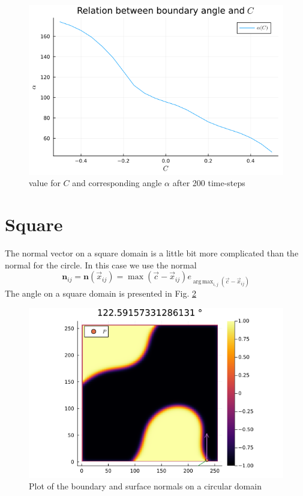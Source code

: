\documentclass{mimosis}
\DeclareMathOperator*{\argmax}{arg\,\max}
\begin{document}
\begin{figure}[htbp]
\centering
\includegraphics[width=.9\linewidth]{images/angle-values-circle.png}
\caption{\label{fig:angle-table}value for \(C\) and corresponding angle \(\alpha\) after 200 time-steps}
\end{figure}
\section{Square}
\label{sec:orgdfcdecb}
The normal vector on a square domain is a little bit more complicated than the normal for the circle. In this case we use the normal
\begin{equation}
\label{eq:9}
\mathbf{n}_{ij} = \mathbf{n}(\vec{x}_{ij}) = \max(\vec{c} - \vec{x}_{ij}) e_{\argmax_{i,j}(\vec{c} - \vec{x}_{ij})}
\end{equation}
The angle on a square domain is presented in Fig. \ref{fig:angle-on-square}
\begin{figure}[htbp]
\centering
\includegraphics[width=.9\linewidth]{images/angle-square.png}
\caption{\label{fig:angle-on-square}Plot of the boundary and surface normals on a circular domain}
\end{figure}
\end{document}

